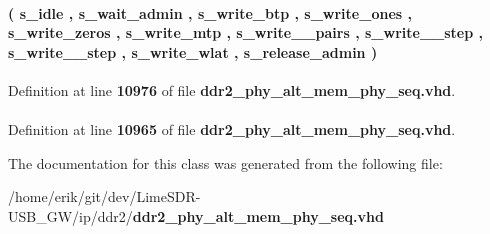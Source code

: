 \paragraph[{t\+\_\+dgwb\+\_\+state}]{ {\bfseries \textcolor{vhdlchar}{(}\textcolor{vhdlchar}{ }\textcolor{vhdlchar}{s\+\_\+idle}\textcolor{vhdlchar}{ }\textcolor{vhdlchar}{,}\textcolor{vhdlchar}{ }\textcolor{vhdlchar}{s\+\_\+wait\+\_\+admin}\textcolor{vhdlchar}{ }\textcolor{vhdlchar}{,}\textcolor{vhdlchar}{ }\textcolor{vhdlchar}{s\+\_\+write\+\_\+btp}\textcolor{vhdlchar}{ }\textcolor{vhdlchar}{,}\textcolor{vhdlchar}{ }\textcolor{vhdlchar}{s\+\_\+write\+\_\+ones}\textcolor{vhdlchar}{ }\textcolor{vhdlchar}{,}\textcolor{vhdlchar}{ }\textcolor{vhdlchar}{s\+\_\+write\+\_\+zeros}\textcolor{vhdlchar}{ }\textcolor{vhdlchar}{,}\textcolor{vhdlchar}{ }\textcolor{vhdlchar}{s\+\_\+write\+\_\+mtp}\textcolor{vhdlchar}{ }\textcolor{vhdlchar}{,}\textcolor{vhdlchar}{ }\textcolor{vhdlchar}{s\+\_\+write\+\_\+\_\+pairs}\textcolor{vhdlchar}{ }\textcolor{vhdlchar}{,}\textcolor{vhdlchar}{ }\textcolor{vhdlchar}{s\+\_\+write\+\_\+\_\+step}\textcolor{vhdlchar}{ }\textcolor{vhdlchar}{,}\textcolor{vhdlchar}{ }\textcolor{vhdlchar}{s\+\_\+write\+\_\+\_\+step}\textcolor{vhdlchar}{ }\textcolor{vhdlchar}{,}\textcolor{vhdlchar}{ }\textcolor{vhdlchar}{s\+\_\+write\+\_\+wlat}\textcolor{vhdlchar}{ }\textcolor{vhdlchar}{,}\textcolor{vhdlchar}{ }\textcolor{vhdlchar}{s\+\_\+release\+\_\+admin}\textcolor{vhdlchar}{ }\textcolor{vhdlchar}{)}\textcolor{vhdlchar}{ }} \hspace{0.3cm}{\ttfamily [Type]}}\label{classddr2__phy__alt__mem__phy__dgwb_1_1rtl_aff2c78ea2dc5deaa6369cb3e540d2120}


Definition at line {\bf 10976} of file {\bf ddr2\+\_\+phy\+\_\+alt\+\_\+mem\+\_\+phy\+\_\+seq.\+vhd}.

\paragraph[{work}]{\hspace{0.3cm}{\ttfamily [Library]}}\label{classddr2__phy__alt__mem__phy__dgwb_1_1rtl_a9f49de6f5eed5b4488cba6c9cdd1c215}


Definition at line {\bf 10965} of file {\bf ddr2\+\_\+phy\+\_\+alt\+\_\+mem\+\_\+phy\+\_\+seq.\+vhd}.



The documentation for this class was generated from the following file\+:\begin{DoxyCompactItemize}
\item 
/home/erik/git/dev/\+Lime\+S\+D\+R-\/\+U\+S\+B\+\_\+\+G\+W/ip/ddr2/{\bf ddr2\+\_\+phy\+\_\+alt\+\_\+mem\+\_\+phy\+\_\+seq.\+vhd}\end{DoxyCompactItemize}
